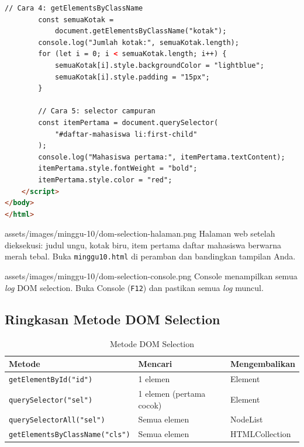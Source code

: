 \begin{lstlisting}[language=HTML, caption={Demonstrasi DOM Selection}, label={lst:10-dom}]
        // Cara 4: getElementsByClassName
        const semuaKotak =
            document.getElementsByClassName("kotak");
        console.log("Jumlah kotak:", semuaKotak.length);
        for (let i = 0; i < semuaKotak.length; i++) {
            semuaKotak[i].style.backgroundColor = "lightblue";
            semuaKotak[i].style.padding = "15px";
        }

        // Cara 5: selector campuran
        const itemPertama = document.querySelector(
            "#daftar-mahasiswa li:first-child"
        );
        console.log("Mahasiswa pertama:", itemPertama.textContent);
        itemPertama.style.fontWeight = "bold";
        itemPertama.style.color = "red";
    </script>
</body>
</html>
\end{lstlisting}

\begin{tangkapanlayar}
  {assets/images/minggu-10/dom-selection-halaman.png}
  {Halaman web setelah dieksekusi: judul ungu, kotak biru, item pertama daftar mahasiswa berwarna merah tebal.}
  {Buka \texttt{minggu10.html} di peramban dan bandingkan tampilan Anda.}
\end{tangkapanlayar}

\begin{tangkapanlayar}
  {assets/images/minggu-10/dom-selection-console.png}
  {Console menampilkan semua \emph{log} DOM selection.}
  {Buka Console (\texttt{F12}) dan pastikan semua \emph{log} muncul.}
\end{tangkapanlayar}

\subsection{Ringkasan Metode DOM Selection}

\begin{table}[htbp]
\centering
\caption{Metode DOM Selection}
\label{tab:10-dom}
\begin{tabular}{lll}
\toprule
\textbf{Metode} & \textbf{Mencari} & \textbf{Mengembalikan} \\
\midrule
\texttt{getElementById("id")} & 1 elemen & Element \\
\texttt{querySelector("sel")} & 1 elemen (pertama cocok) & Element \\
\texttt{querySelectorAll("sel")} & Semua elemen & NodeList \\
\texttt{getElementsByClassName("cls")} & Semua elemen & HTMLCollection \\
\bottomrule
\end{tabular}
\end{table}

